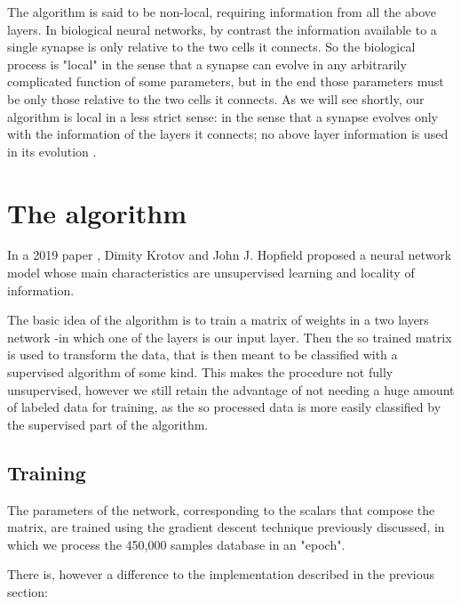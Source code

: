 \documentclass[a4paper]{report}
\begin{document}
The algorithm is said to be non-local, requiring information from all the above layers.
In biological neural networks, by contrast the information available to a single synapse is only relative to the two cells it connects.
So the biological process is "local" in the sense that a synapse can evolve in any arbitrarily complicated function of some parameters, but in the end those parameters must be only those relative to the two cells it connects.
As we will see shortly, our algorithm is local in a less strict sense: in the sense that a synapse evolves only with the information of the layers it connects; no above layer information is used in its evolution  \cite{zhang2017split}.

\section{The algorithm}
In a 2019 paper \cite{krotov2019unsupervised}, Dimity Krotov and John J. Hopfield proposed a neural network model whose main characteristics are unsupervised learning and locality of information.

The basic idea of the algorithm is to train a matrix of weights in a two layers network -in which one of the layers is our input layer.
Then the so trained matrix is used to transform the data, that is then meant to be classified with a supervised algorithm of some kind.
This makes the procedure not fully unsupervised, however we still retain the advantage of not needing a huge amount of labeled data for training, as the so processed data is more easily classified by the supervised part of the algorithm.

\subsection{Training}

The parameters of the network, corresponding to the scalars that compose the matrix, are trained using the gradient descent technique previously discussed, in which we process the 450,000 samples database in an "epoch".

There is, however a difference to the implementation described in the previous section:
\end{document}
